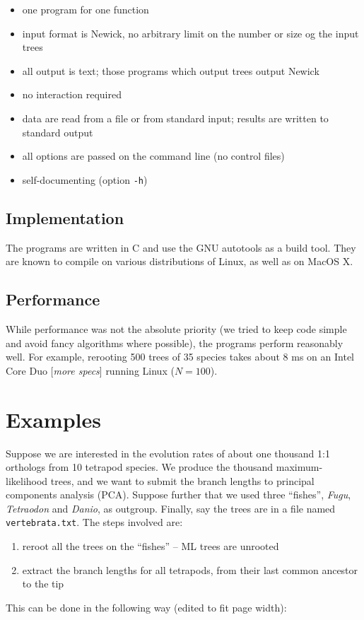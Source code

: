 \documentclass[a4paper,11pt]{article}
\begin{document}
\begin{itemize}
 \item one program for one function
 \item input format is Newick, no arbitrary limit on the number or size og the input trees
 \item all output is text; those programs which output trees output Newick
 \item no interaction required
 \item data are read from a file or from standard input; results are written to standard output
 \item all options are passed on the command line (no control files)
 \item self-documenting (option \texttt{-h})
\end{itemize}

\subsection*{Implementation}

The programs are written in C and use the \textsc{GNU} autotools as a build tool. They are known to compile on various distributions of Linux, as well as on MacOS X.

\subsection*{Performance}

While performance was not the absolute priority (we tried to keep code simple and avoid fancy algorithms where possible), the programs perform reasonably well. For example, rerooting 500 trees of 35 species takes about 8 ms on an Intel Core Duo [\textit{more specs}] running Linux ($N = 100$).

\section*{Examples}

Suppose we are interested in the evolution rates of about one thousand 1:1 orthologs from 10 tetrapod species. We produce the thousand maximum-likelihood trees, and we want to submit the branch lengths to principal components analysis (\textsc{PCA}). Suppose further that we used three ``fishes'', \textit{Fugu}, \textit{Tetraodon} and \textit{Danio}, as outgroup. Finally, say the trees are in a file named \texttt{vertebrata.txt}. The steps involved are:
\begin{enumerate}
 \item reroot all the trees on the ``fishes'' -- ML trees are unrooted
 \item extract the branch lengths for all tetrapods, from their last common ancestor to the tip
\end{enumerate}
This can be done in the following way (edited to fit page width):
\end{document}
